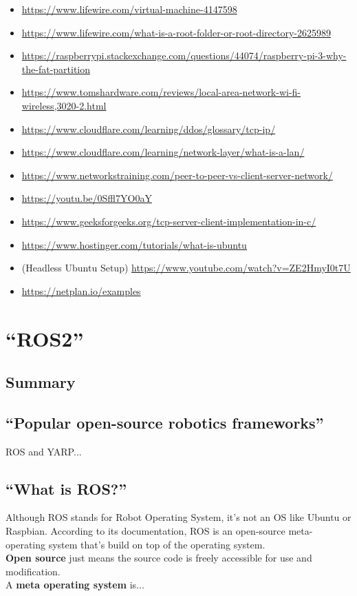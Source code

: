 \documentclass[a4paper, 10pt]{article}
\begin{document}
\begin{itemize}
        \item \url{https://www.lifewire.com/virtual-machine-4147598}
        \item \url{https://www.lifewire.com/what-is-a-root-folder-or-root-directory-2625989}
        \item \url{https://raspberrypi.stackexchange.com/questions/44074/raspberry-pi-3-why-the-fat-partition}
        \item \url{https://www.tomshardware.com/reviews/local-area-network-wi-fi-wireless,3020-2.html}
        \item \url{https://www.cloudflare.com/learning/ddos/glossary/tcp-ip/}
        \item \url{https://www.cloudflare.com/learning/network-layer/what-is-a-lan/}
        \item \url{https://www.networkstraining.com/peer-to-peer-vs-client-server-network/}
        \item \url{https://youtu.be/0Sffl7YO0aY}
        \item \url{https://www.geeksforgeeks.org/tcp-server-client-implementation-in-c/}
        \item \url{https://www.hostinger.com/tutorials/what-is-ubuntu}
        \item (Headless Ubuntu Setup) \url{https://www.youtube.com/watch?v=ZE2HmyI0t7U}
        \item \url{https://netplan.io/examples}
        \end{itemize}



 \pagebreak

\section{``ROS2''}
\subsection*{Summary}
	\subsection{``Popular open-source robotics frameworks''}
	ROS and YARP...

        \subsection{``What is ROS?''}
        Although ROS stands for Robot Operating System, it’s not an OS  like Ubuntu or Raspbian. According to its documentation, ROS is an open-source meta-operating system that’s build on top of the operating system.\\
        \textbf{Open source} just means the source code is freely accessible for use and modification.\\
        A \textbf{meta operating system} is... \\
        
\end{document}
